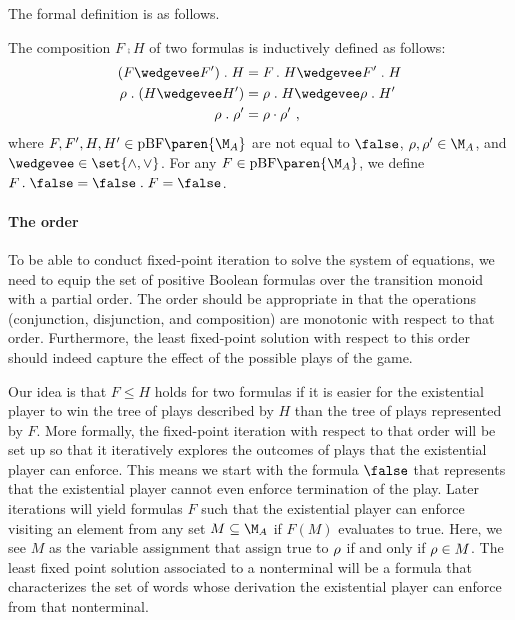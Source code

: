 \documentclass[../../diss.tex]{subfiles}
\begin{document}
The formal definition is as follows.

\begin{definition}%
\label{Definition:CFComp}%
    The composition $F \comp H$ of two formulas is inductively defined as follows:
    \begin{align*}
        (F \wedgevee F') \comp H &= F \comp H \wedgevee F' \comp H
        \\
        \tbox \comp (H \wedgevee H') &= \tbox \comp H \wedgevee \tbox \comp H'
        \\
        \tbox \comp \tbox' &= \tbox \relcomp\tbox'
        \ ,
    \end{align*}
    where $F,F',H,H' \in \pBF\paren{\nfatransmonoid{A}}$ are not equal to $\false$, $\tbox,\tbox' \in \nfatransmonoid{A}$, and ${\wedgevee} \in \set{\wedge, \vee}$.
    For any $F \in \pBF\paren{\nfatransmonoid{A}}$, we define $F \comp \false = \false \comp F = \false$.
\end{definition}

\paragraph{The order}

To be able to conduct fixed-point iteration to solve the system of equations, we need to equip the set of positive Boolean formulas over the transition monoid with a partial order.
The order should be appropriate in that the operations (conjunction, disjunction, and composition) are monotonic with respect to that order.
Furthermore, the least fixed-point solution with respect to this order should indeed capture the effect of the possible plays of the game.

Our idea is that $F \leq H$ holds for two formulas if it is easier for the existential player to win the tree of plays described by $H$ than the tree of plays represented by $F$.
More formally, the fixed-point iteration with respect to that order will be set up so that it iteratively explores the outcomes of plays that the existential player can enforce.
This means we start with the formula $\false$ that represents that the existential player cannot even enforce termination of the play.
Later iterations will yield formulas $F$ such that the existential player can enforce visiting an element from any set $M \subseteq \nfatransmonoid{A}$ if $F(M)$ evaluates to true.
Here, we see $M$ as the variable assignment that assign true to $\tbox$ if and only if $\tbox \in M$.
The least fixed point solution associated to a nonterminal will be a formula that characterizes the set of words whose derivation the existential player can enforce from that nonterminal.
\end{document}
